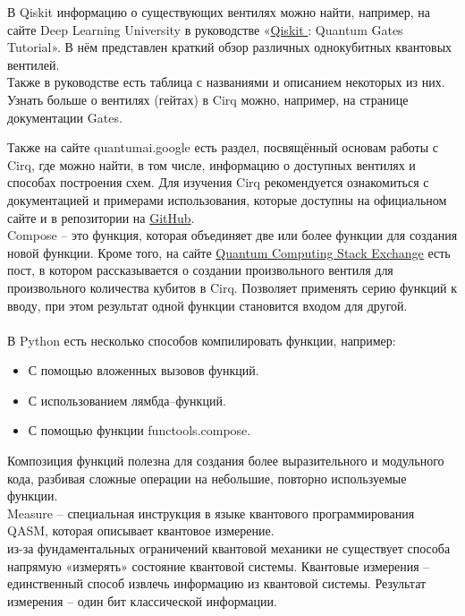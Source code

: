 \documentclass[12pt,a4paper]{article}
\begin{document}
	В Qiskit информацию о существующих вентилях можно найти, например, на сайте Deep Learning University в руководстве «\href{https://deeplearninguniversity.com/qiskit/qiskit--quantum--gates/}	{Qiskit }: Quantum Gates Tutorial». В нём представлен краткий обзор различных однокубитных квантовых вентилей.\\
	\indent Также в руководстве есть таблица с названиями и описанием некоторых из них.
	Узнать больше о вентилях (гейтах) в Cirq можно, например, на странице документации Gates.
	
	
	\indent	Также на сайте quantumai.google есть раздел, посвящённый основам работы с Cirq, где можно найти, в том числе, информацию о доступных вентилях и способах построения схем.
	Для изучения Cirq рекомендуется ознакомиться с документацией и примерами использования, которые доступны на официальном сайте и в репозитории на \href{https://github.com/quantumlib/Cirq?ysclid=maxou3q828463071125}{GitHub}.
	\\
	\indent	Compose -- это функция, которая объединяет две или более функции для создания новой функции.
	Кроме того, на сайте \href{https://translated.turbopages.org/proxy\_u/en--ru.ru.fc1f353f--682d8ff9--23362e3b--74722d776562/https/quantumcomputing.stackexchange.com/questions/14266/cirq--creating--an--arbitrary--gate--for--an--arbitrary--number--of--qubits}{Quantum Computing Stack Exchange}  есть пост, в котором рассказывается о создании произвольного вентиля для произвольного количества кубитов в Cirq. Позволяет применять серию функций к вводу, при этом результат одной функции становится входом для другой.
	\\
	\hspace{1em}\\
	В Python есть несколько способов компилировать функции, например: 
	\begin{itemize}
		
		\item С помощью вложенных вызовов функций.
		\item С использованием лямбда--функций.
		\item С помощью функции functools.compose.\end{itemize}
	Композиция функций полезна для создания более выразительного и модульного кода, разбивая сложные операции на небольшие, повторно используемые функции.\\
	\indent	Measure -- специальная инструкция в языке квантового программирования QASM, которая описывает квантовое измерение.\\
	\indent	из-за фундаментальных ограничений квантовой механики не существует способа напрямую «измерять» состояние квантовой системы. Квантовые измерения -- единственный способ извлечь информацию из квантовой системы. Результат измерения -- один бит классической информации.\\
\end{document}

